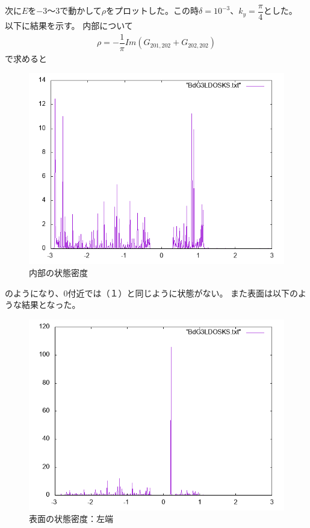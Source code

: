 \documentclass{jarticle}
\begin{document}
次に$E$を$-3$〜$3$で動かして$\rho$をプロットした。この時$\delta=10^{-3}$、$k_y=\dfrac{\pi}{4}$とした。
以下に結果を示す。
内部について
\begin{align}
\rho=-\dfrac{1}{\pi}Im(G_{201,202}+G_{202,202})
\end{align}
で求めると
\begin{figure}[H]
	\centering
	\includegraphics[scale=0.7]{BdG3KSLDOSinternal.png}
	\caption{内部の状態密度}
\end{figure}
のようになり、$0$付近では（１）と同じように状態がない。
また表面は以下のような結果となった。
\begin{figure}[H]
	\centering
	\includegraphics[scale=0.7]{BdG3KSLDOSedge1.png}
	\caption{表面の状態密度：左端}
\end{figure}
\end{document}
